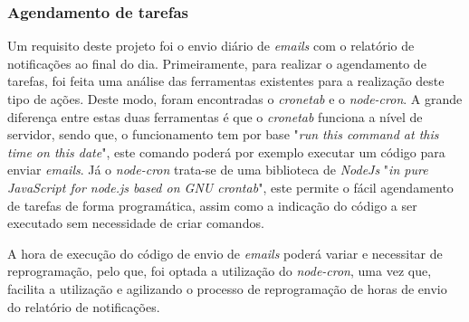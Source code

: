 \subsubsection{Agendamento de tarefas}

Um requisito deste projeto foi o envio diário de \textit{emails} com o relatório de notificações ao final do dia. Primeiramente, para realizar o agendamento de tarefas, foi feita uma análise das ferramentas existentes para a realização deste tipo de ações. Deste modo, foram encontradas o \textit{cronetab} e o \textit{node-cron}. A grande diferença entre estas duas ferramentas é que o \textit{cronetab} funciona a nível de servidor, sendo que, o funcionamento tem por base "\emph{run this command at this time
on this date}"\citep{crontab}, este comando poderá por exemplo executar um código para enviar \textit{emails}. Já o \textit{node-cron} trata-se de uma biblioteca de \textit{NodeJs} "\emph{in pure JavaScript for node.js based on GNU crontab}"\citep{node_cron}, este permite o fácil agendamento de tarefas de forma programática, assim como a indicação do código a ser executado sem necessidade de criar comandos.

A hora de execução do código de envio de \textit{emails} poderá variar e necessitar de reprogramação, pelo que, foi optada a utilização do \textit{node-cron}, uma vez que, facilita a utilização e agilizando o processo de reprogramação de horas de envio do relatório de notificações.